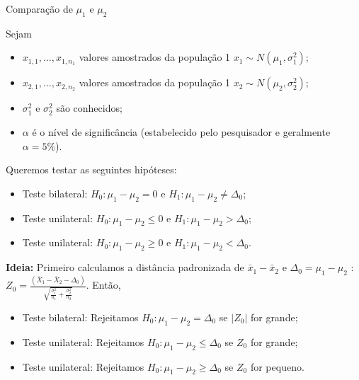 \documentclass[9pt]{beamer}
\begin{document}
\begin{frame}{Comparação de $\mu_1$ e $\mu_2$}

Sejam
\begin{itemize}
	\item $x_{1,1}, \dots, x_{1, n_1}$ valores amostrados da população 1 $x_1 \sim N(\mu_1, \sigma_1^2)$;
	\item $x_{2,1}, \dots, x_{2, n_2}$ valores amostrados da população 1 $x_2 \sim N(\mu_2, \sigma_2^2)$;
	\item $\sigma_1^2$ e $\sigma_2^2$ são conhecidos;
	\item $\alpha$ é o nível de significância (estabelecido pelo pesquisador e geralmente $\alpha=5\%$). 
\end{itemize}
\vfill

Queremos testar as seguintes hipóteses:
\begin{itemize}
	\item Teste bilateral: $H_0: \mu_1 - \mu_2 = 0$ e $H_1: \mu_1 - \mu_2 \neq \Delta_0$;
	\item Teste unilateral: $H_0: \mu_1 - \mu_2 \leq 0$ e $H_1: \mu_1 - \mu_2 > \Delta_0$;
	\item Teste unilateral: $H_0: \mu_1 - \mu_2 \geq 0$ e $H_1: \mu_1 - \mu_2 < \Delta_0$.
\end{itemize}
\vfill

\textbf{Ideia:} Primeiro calculamos a distância padronizada de $\bar{x}_1 - \bar{x}_2$ e $\Delta_0=\mu_1 - \mu_2$ : $Z_0 = \frac{(\bar{X}_1 - \bar{X}_2 - \Delta_0)}{\sqrt{ \frac{\sigma_1^2}{n_1} + \frac{\sigma_2^2}{n_2} }}$. Então, 
\begin{itemize}
	\item Teste bilateral: Rejeitamos $H_0: \mu_1 - \mu_2 =\Delta_0$ se $\lvert Z_0 \rvert$ for grande;
	\item Teste unilateral: Rejeitamos $H_0: \mu_1 - \mu_2 \leq \Delta_0$ se $Z_0 $ for grande;
	\item Teste unilateral: Rejeitamos $H_0: \mu_1 - \mu_2 \geq \Delta_0$ se $Z_0 $ for pequeno.
\end{itemize}

\end{frame}
\end{document}
